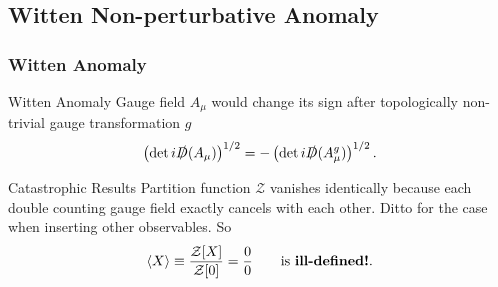 \documentclass[10pt,aspectratio=43,xcolor=x11names]{beamer}%
\begin{document}
	\subsection{Witten Non-perturbative Anomaly}
		\begin{frame}
			\frametitle{Witten Anomaly}
			\begin{greenblock}{Witten Anomaly}
				Gauge field $A_\mu$ would change its sign after topologically non-trivial gauge transformation $g$
				\begin{equation*}
					\left(\mathrm{det}\,i\slashed{D}(A_\mu)\right)^{1/2}=-\left(\mathrm{det}\,i\slashed{D}(A^g_\mu)\right)^{1/2}.
				\end{equation*}
			\end{greenblock}
			\pause
			\begin{block}{Catastrophic Results}
				Partition function $\mathcal{Z}$ vanishes identically because each double counting gauge field exactly cancels with each other. Ditto for the case when inserting other observables. So
				\begin{equation*}
					\left\langle X\right\rangle\equiv\dfrac{\mathcal{Z}[X]}{\mathcal{Z}[0]}=\dfrac{0}{0}\qquad\text{is \textbf{ill-defined!}}.
				\end{equation*}
			\end{block}
		\end{frame}
\end{document}
